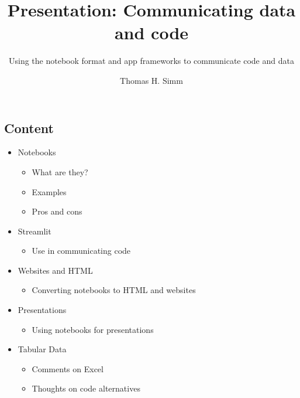\documentclass[
  letterpaper,
  DIV=11,
  numbers=noendperiod]{scrartcl}
\title{Presentation: Communicating data and code}
\subtitle{Using the notebook format and app frameworks to communicate
code and data}
\author{Thomas H. Simm}
\date{}
\providecommand{\tightlist}{%
  \setlength{\itemsep}{0pt}\setlength{\parskip}{0pt}}\usepackage{longtable,booktabs,array}
\begin{document}
\maketitle
\ifdefined\Shaded\renewenvironment{Shaded}{\begin{tcolorbox}[enhanced, boxrule=0pt, interior hidden, breakable, frame hidden, borderline west={3pt}{0pt}{shadecolor}, sharp corners]}{\end{tcolorbox}}\fi

\hypertarget{content}{%
\subsection{Content}\label{content}}

\begin{itemize}
\tightlist
\item
  Notebooks

  \begin{itemize}
  \tightlist
  \item
    What are they?
  \item
    Examples
  \item
    Pros and cons
  \end{itemize}
\item
  Streamlit

  \begin{itemize}
  \tightlist
  \item
    Use in communicating code
  \end{itemize}
\item
  Websites and HTML

  \begin{itemize}
  \tightlist
  \item
    Converting notebooks to HTML and websites
  \end{itemize}
\item
  Presentations

  \begin{itemize}
  \tightlist
  \item
    Using notebooks for presentations
  \end{itemize}
\item
  Tabular Data

  \begin{itemize}
  \tightlist
  \item
    Comments on Excel
  \item
    Thoughts on code alternatives
  \end{itemize}
\end{itemize}
\end{document}
